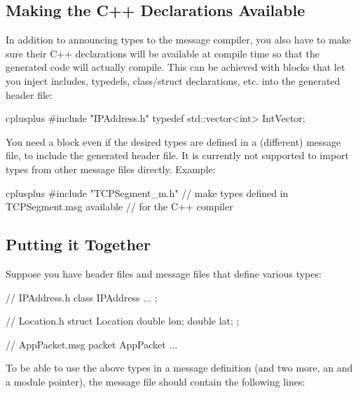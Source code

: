 \subsection{Making the C++ Declarations Available}
\label{sec:msg-def:making-cpp-declarations-available}

In addition to announcing types to the message compiler, you also have to make
sure their C++ declarations will be available at compile time so that the
generated code will actually compile. This can be achieved with
 blocks that let you inject includes, typedefs,
class/struct declarations, etc. into the generated header file:

\begin{msg}
cplusplus {{
#include "IPAddress.h"
typedef std::vector<int> IntVector;
}}
\end{msg}

You need a  block even if the desired types are defined
in a (different) message file, to include the generated header file.
It is currently not supported to import types from other message files directly.
Example:

\begin{msg}
cplusplus {{
#include "TCPSegment_m.h"  // make types defined in TCPSegment.msg available
                           // for the C++ compiler
}}
\end{msg}


\subsection{Putting it Together}
\label{sec:msg-def:putting-it-together}

Suppose you have header files and message files that define various types:

\begin{cpp}
// IPAddress.h
class IPAddress {
   ...
};
\end{cpp}

\begin{cpp}
// Location.h
struct Location {
    double lon;
    double lat;
};
\end{cpp}

\begin{msg}
// AppPacket.msg
packet AppPacket {
   ...
}
\end{msg}

To be able to use the above types in a message definition (and two more,
an  and a module pointer), the message file should contain
the following lines:


